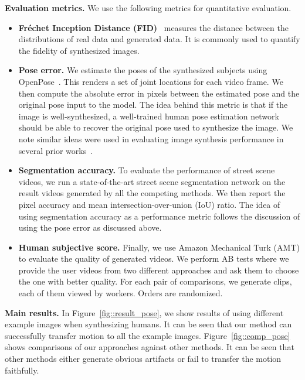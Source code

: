 \documentclass{article}
\begin{document}
{\bf Evaluation metrics.} We use the following metrics for quantitative evaluation.
\begin{itemize}[leftmargin=5mm,topsep=0pt]
\item {\bf Fr\'echet Inception Distance (FID)}~\cite{heusel2017gans} measures the distance between the distributions of real data and generated data. It is commonly used to quantify the fidelity of synthesized images.

\item {\bf Pose error.} We estimate the poses of the synthesized subjects using OpenPose~\cite{cao2018openpose}. This renders a set of joint locations for each video frame. We then compute the absolute error in pixels between the estimated pose and the original pose input to the model. The idea behind this metric is that if the image is well-synthesized, a well-trained human pose estimation network should be able to recover the original pose used to synthesize the image. 
We note similar ideas were used in evaluating image synthesis performance in several prior works~\cite{isola2017image,wang2017high,wang2018video}.

\item {\bf Segmentation accuracy.} To evaluate the performance of street scene videos, we run a state-of-the-art street scene segmentation network on the result videos generated by all the competing methods. We then report the pixel accuracy and mean intersection-over-union (IoU) ratio. The idea of using segmentation accuracy as a performance metric follows the discussion of using the pose error as discussed above.

\item {\bf Human subjective score.} Finally, we use Amazon Mechanical Turk (AMT) to evaluate the quality of generated videos. We perform AB tests where we provide the user videos from two different approaches and ask them to choose the one with better quality. 
For each pair of comparisons, we generate  clips, each of them viewed by  workers. Orders are randomized.
\end{itemize}

{\bf Main results.} In Figure~\ref{fig::result_pose}, we show results of using different example images when synthesizing humans. It can be seen that our method can successfully transfer motion to all the example images. Figure~\ref{fig::comp_pose} shows comparisons of our approaches against other methods. It can be seen that other methods either generate obvious artifacts or fail to transfer the motion faithfully.
\end{document}
